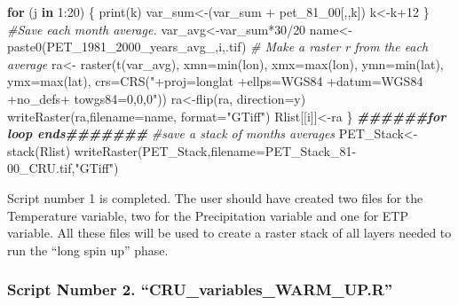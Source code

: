 \documentclass[
  10pt,
  b5paper,
]{book}
\newenvironment{Shaded}{\begin{snugshade}}{\end{snugshade}}
\newcommand{\AttributeTok}[1]{\textcolor[rgb]{0.77,0.63,0.00}{#1}}
\newcommand{\CommentTok}[1]{\textcolor[rgb]{0.56,0.35,0.01}{\textit{#1}}}
\newcommand{\ControlFlowTok}[1]{\textcolor[rgb]{0.13,0.29,0.53}{\textbf{#1}}}
\newcommand{\DecValTok}[1]{\textcolor[rgb]{0.00,0.00,0.81}{#1}}
\newcommand{\DocumentationTok}[1]{\textcolor[rgb]{0.56,0.35,0.01}{\textbf{\textit{#1}}}}
\newcommand{\FunctionTok}[1]{\textcolor[rgb]{0.00,0.00,0.00}{#1}}
\newcommand{\NormalTok}[1]{#1}
\newcommand{\OtherTok}[1]{\textcolor[rgb]{0.56,0.35,0.01}{#1}}
\newcommand{\SpecialCharTok}[1]{\textcolor[rgb]{0.00,0.00,0.00}{#1}}
\newcommand{\StringTok}[1]{\textcolor[rgb]{0.31,0.60,0.02}{#1}}
\begin{document}
\begin{Shaded}
\begin{Highlighting}[]
\ControlFlowTok{for}\NormalTok{ (j }\ControlFlowTok{in} \DecValTok{1}\SpecialCharTok{:}\DecValTok{20}\NormalTok{) \{}
\FunctionTok{print}\NormalTok{(k)}
\NormalTok{var\_sum}\OtherTok{\textless{}{-}}\NormalTok{(var\_sum }\SpecialCharTok{+}\NormalTok{ pet\_81\_00[,,k])}
\NormalTok{ k}\OtherTok{\textless{}{-}}\NormalTok{k}\SpecialCharTok{+}\DecValTok{12}
\NormalTok{ \}}
\CommentTok{\#Save each month average. }
\NormalTok{ var\_avg}\OtherTok{\textless{}{-}}\NormalTok{var\_sum}\SpecialCharTok{*}\DecValTok{30}\SpecialCharTok{/}\DecValTok{20}
\NormalTok{name}\OtherTok{\textless{}{-}}\FunctionTok{paste0}\NormalTok{(}\StringTok{\textquotesingle{}PET\_1981\_2000\_years\_avg\_\textquotesingle{}}\NormalTok{,i,}\StringTok{\textquotesingle{}.tif\textquotesingle{}}\NormalTok{)}
 \CommentTok{\# Make a raster r from the each average}
\NormalTok{ra}\OtherTok{\textless{}{-}} \FunctionTok{raster}\NormalTok{(}\FunctionTok{t}\NormalTok{(var\_avg), }\AttributeTok{xmn=}\FunctionTok{min}\NormalTok{(lon), }\AttributeTok{xmx=}\FunctionTok{max}\NormalTok{(lon), }\AttributeTok{ymn=}\FunctionTok{min}\NormalTok{(lat), }\AttributeTok{ymx=}\FunctionTok{max}\NormalTok{(lat), }\AttributeTok{crs=}\FunctionTok{CRS}\NormalTok{(}\StringTok{"+proj=longlat +ellps=WGS84 +datum=WGS84 +no\_defs+ towgs84=0,0,0"}\NormalTok{))}
\NormalTok{ra}\OtherTok{\textless{}{-}}\FunctionTok{flip}\NormalTok{(ra, }\AttributeTok{direction=}\StringTok{\textquotesingle{}y\textquotesingle{}}\NormalTok{)}
\FunctionTok{writeRaster}\NormalTok{(ra,}\AttributeTok{filename=}\NormalTok{name, }\AttributeTok{format=}\StringTok{"GTiff"}\NormalTok{)}
\NormalTok{Rlist[[i]]}\OtherTok{\textless{}{-}}\NormalTok{ra}
\NormalTok{\}}
\DocumentationTok{\#\#\#\#\#\#for loop ends\#\#\#\#\#\#\#}
 \CommentTok{\#save a stack of months averages}
\NormalTok{ PET\_Stack}\OtherTok{\textless{}{-}}\FunctionTok{stack}\NormalTok{(Rlist)}
\FunctionTok{writeRaster}\NormalTok{(PET\_Stack,}\AttributeTok{filename=}\StringTok{\textquotesingle{}PET\_Stack\_81{-}00\_CRU.tif\textquotesingle{}}\NormalTok{,}\StringTok{"GTiff"}\NormalTok{) }
\end{Highlighting}
\end{Shaded}

Script number 1 is completed. The user should have created two files for the Temperature variable, two for the Precipitation variable and one for ETP variable. All these files will be used to create a raster stack of all layers needed to run the ``long spin up'' phase.

\hypertarget{script-number-2.-cru_variables_warm_up.r}{%
\subsubsection{Script Number 2. ``CRU\_variables\_WARM\_UP.R''}\label{script-number-2.-cru_variables_warm_up.r}}
\end{document}
